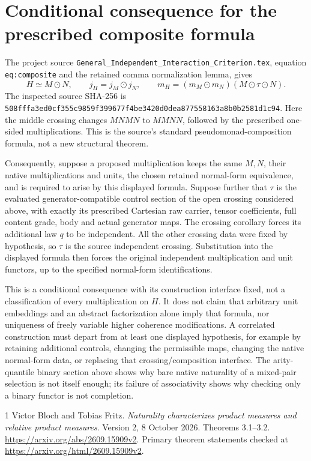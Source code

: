 \documentclass{article}
\begin{document}
\section{Conditional consequence for the prescribed composite formula}
The project source
\texttt{General\_Independent\_Interaction\_Criterion.tex}, equation
\texttt{eq:composite} and the retained comma normalization lemma, gives
\[
 H\simeq M\odot N,\qquad
 j_H=j_M\odot j_N,\qquad
 m_H=(m_M\odot m_N)(M\odot\tau\odot N).
\]
The inspected source SHA-256 is
\texttt{508fffa3ed0cf355c9859f399677f4be3420d0dea877558163a8b0b2581d1c94}.
Here the middle crossing changes $MN MN$ to $MM NN$, followed by the
prescribed one-sided multiplications. This is the source's standard
pseudomonad-composition formula, not a new structural theorem.

Consequently, suppose a proposed multiplication keeps the same $M,N$, their
native multiplications and units, the chosen retained normal-form equivalence,
and is required to arise by this displayed formula. Suppose further that
$\tau$ is the evaluated generator-compatible control section of the open
crossing considered above, with exactly its prescribed Cartesian raw carrier,
tensor coefficients, full content grade, body and actual generator maps.
The crossing corollary forces its additional law $q$ to be independent.
All the other crossing data were fixed by hypothesis, so $\tau$ is the
source independent crossing. Substitution into the displayed formula then
forces the original independent multiplication and unit functors, up to the
specified normal-form identifications.

This is a conditional consequence with its construction interface fixed,
not a classification of every multiplication on $H$. It does not claim that
arbitrary unit embeddings and an abstract factorization alone imply that
formula, nor uniqueness of freely variable higher coherence modifications.
A correlated construction must depart from at least one displayed hypothesis,
for example by retaining additional controls, changing the permissible maps,
changing the native normal-form data, or replacing that crossing/composition
interface. The arity-quantile binary section above shows why bare native
naturality of a mixed-pair selection is not itself enough; its failure of
associativity shows why checking only a binary functor is not completion.

\begin{thebibliography}{1}
 Victor Bloch and Tobias Fritz.
\emph{Naturality characterizes product measures and relative product measures}.
Version 2, 8 October 2026. Theorems 3.1--3.2.
\url{https://arxiv.org/abs/2609.15909v2}.
Primary theorem statements checked at
\url{https://arxiv.org/html/2609.15909v2}.
\end{thebibliography}
\end{document}
